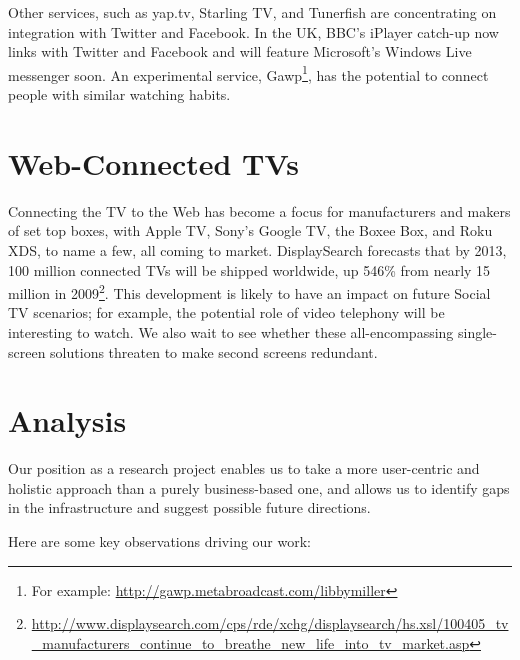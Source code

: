 \documentclass{notube}
\begin{document}
Other services, such as yap.tv, Starling TV, and Tunerfish are concentrating on integration with Twitter and Facebook. In the UK, BBC's iPlayer catch-up now links with Twitter and Facebook and will feature Microsoft's Windows Live messenger soon. An experimental service, Gawp\footnote{For example: \url{http://gawp.metabroadcast.com/libbymiller}}, has the potential to connect people with similar watching habits.


\section{Web-Connected TVs}

Connecting the TV to the Web has become a focus for manufacturers and makers of set top boxes, with Apple TV, Sony's Google TV, the Boxee Box, and Roku XDS, to name a few, all coming to market. DisplaySearch forecasts that by 2013, 100 million connected TVs will be shipped worldwide, up 546\% from nearly 15 million in 2009\footnote{\url{http://www.displaysearch.com/cps/rde/xchg/displaysearch/hs.xsl/100405_tv_manufacturers_continue_to_breathe_new_life_into_tv_market.asp}}. This development is likely to have an impact on future Social TV scenarios; for example, the potential role of video telephony will be interesting to watch. We also wait to see whether these all-encompassing single-screen solutions threaten to make second screens redundant.

\section{Analysis}

Our position as a research project enables us to take a more user-centric and holistic approach than a purely business-based one, and allows us to identify gaps in the infrastructure and suggest possible future directions.

Here are some key observations driving our work:
\end{document}
